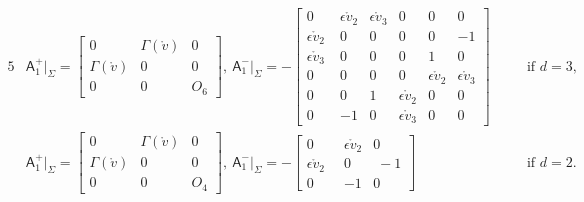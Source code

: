 \documentclass[twoside,11pt]{article}
\numberwithin{equation}{section}
\begin{document}
	\begin{alignat}{5}
		\label{decom1.3D}
	&	{\mathsf{A}}_1^+\big|_{\Sigma}=
		\begin{bmatrix}
			0 & \varGamma(\mathring{v}) &0 \\
			\varGamma(\mathring{v}) & 0 & 0\\
			0  &  0 &  O_{6}
		\end{bmatrix} ,\
		{\mathsf{A}}_1^-\big|_{\Sigma}=-
		\begin{bmatrix}
			 0  &  \epsilon \mathring{v}_2 &  \epsilon \mathring{v}_3 & 0 &0&0 \\[0.3mm]
			 \epsilon \mathring{v}_2\;&0&0&0&0&-1\\[0.3mm]
			\epsilon \mathring{v}_3&0&0&0&1&0\\[0.3mm]
			0 &0&0  &  0  &  \epsilon \mathring{v}_2 &  \epsilon \mathring{v}_3 \\[0.3mm]
			0&0&1 &\epsilon \mathring{v}_2 &0&0\\[0.3mm]
			0&-1&0 &\epsilon \mathring{v}_3&0&0
		\end{bmatrix}
		&&\quad
	\textrm{if }d=3,\\[2mm]
	\label{decom1.2D}
&	{\mathsf{A}}_1^+\big|_{\Sigma}=
	\begin{bmatrix}
		0 & \varGamma(\mathring{v}) &0 \\
		\varGamma(\mathring{v}) & 0 & 0\\
		0  & 0  & O_{4}
	\end{bmatrix} ,\
	{\mathsf{A}}_1^-\big|_{\Sigma}=-
\begin{bmatrix}
	0 & \epsilon \mathring{v}_2&0 \\
	\epsilon \mathring{v}_2\; \;& 0 \;& \;-1\\
	0 & -1 & 0
\end{bmatrix} &&\quad \textrm{if }d=2.
\end{alignat}	
\end{document}
